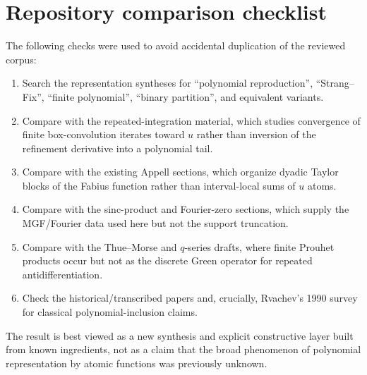 \documentclass[11pt]{article}
\theoremstyle{definition}
\theoremstyle{remark}
\newcommand{\1}{\mathbf{1}}
\begin{document}
\section{Repository comparison checklist}

The following checks were used to avoid accidental duplication of the reviewed
corpus:

\begin{enumerate}
\item Search the representation syntheses for ``polynomial reproduction'',
``Strang--Fix'', ``finite polynomial'', ``binary partition'', and equivalent
variants.
\item Compare with the repeated-integration material, which studies convergence
of finite box-convolution iterates toward $u$ rather than inversion of the
refinement derivative into a polynomial tail.
\item Compare with the existing Appell sections, which organize dyadic Taylor
blocks of the Fabius function rather than interval-local sums of $u$ atoms.
\item Compare with the sinc-product and Fourier-zero sections, which supply the
MGF/Fourier data used here but not the support truncation.
\item Compare with the Thue--Morse and $q$-series drafts, where finite
Prouhet products occur but not as the discrete Green operator for repeated
antidifferentiation.
\item Check the historical/transcribed papers and, crucially, Rvachev's 1990
survey for classical polynomial-inclusion claims.
\end{enumerate}

The result is best viewed as a new synthesis and explicit constructive layer
built from known ingredients, not as a claim that the broad phenomenon of
polynomial representation by atomic functions was previously unknown.
\end{document}
